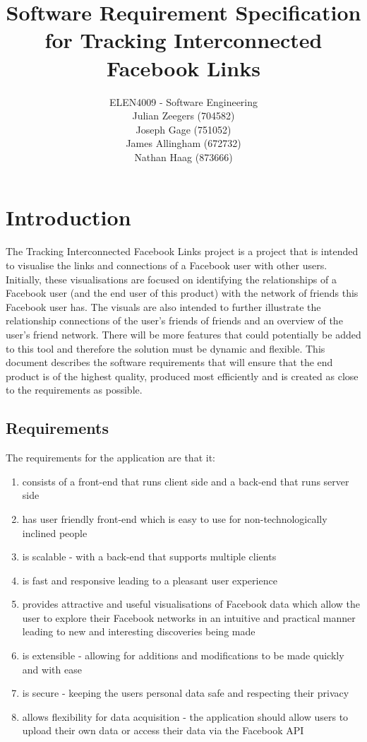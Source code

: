 \documentclass[10pt,onecolumn]{article}
\title{\vspace{-4.2cm}Software Requirement Specification for Tracking Interconnected Facebook Links }
\author{ ELEN4009 - Software Engineering\\ Julian Zeegers (704582) \\  Joseph Gage (751052)\\ James Allingham (672732) \\ Nathan Haag (873666)}
\begin{document}
\date{\vspace{-5ex}}
\maketitle
\pagestyle{plain}
\setcounter{page}{1}



\section{Introduction}
The Tracking Interconnected Facebook Links project is a project that  is intended to visualise the links and connections of a Facebook user with other users. Initially, these visualisations are focused on identifying the relationships of a Facebook user (and the end user of this product) with the network of friends this Facebook user has. The visuals are also intended to further illustrate the relationship connections of the user's friends of friends and an overview of the user's friend network. There will be more features that could potentially be added to this tool and therefore the solution must be dynamic and flexible. This document describes the software requirements that will ensure that the end product is of the highest quality, produced most efficiently and is created as close to the requirements as possible.

\subsection{Requirements}

The requirements for the application are that it:
\begin{enumerate}
\item consists of a front-end that runs client side and a back-end that runs server side 
\item has user friendly front-end which is easy to use for non-technologically inclined people
\item is scalable - with a back-end that supports multiple clients
\item is fast and responsive leading to a pleasant user experience
\item provides attractive and useful visualisations of Facebook data which allow the user to explore their Facebook networks in an intuitive and practical manner leading to new and interesting discoveries being made
\item is extensible - allowing for additions and modifications to be made quickly and with ease
\item is secure - keeping the users personal data safe and respecting their privacy
\item allows flexibility for data acquisition - the application should allow users to upload their own data or access their data via the Facebook API
\end{enumerate}
\end{document}
